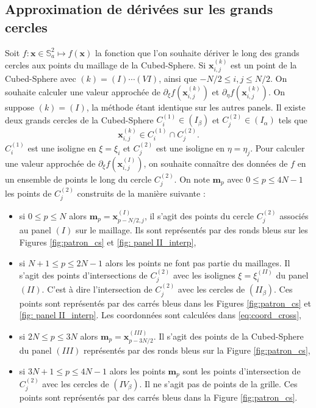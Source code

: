 \subsection{Approximation de dérivées sur les grands cercles}

Soit $f : \mathbf{x}\in \mathbb{S}_a^2 \mapsto f(\mathbf{x})$ la fonction que l'on souhaite dériver le long des grands cercles aux points du maillage de la Cubed-Sphere.
Si $\mathbf{x}_{i,j}^{(k)}$ est un point de la Cubed-Sphere avec $(k) = (I) \cdots (VI)$, ainsi que $-N/2 \leq i,j \leq N/2$. On souhaite calculer une valeur approchée de 
$
\partial_{\xi} f (\mathbf{x}_{i,j}^{(k)})$ et $\partial_{\eta} f (\mathbf{x}_{i,j}^{(k)})$.
On suppose $(k) = (I)$, la méthode étant identique sur les autres panels. Il existe deux grands cercles de la Cubed-Sphere $C_i^{(1)} \in (I_{\beta})$ et $C_j^{(2)} \in (I_{\alpha})$ tels que 
\begin{equation}
\mathbf{x}_{i,j}^{(k)} \in C_i^{(1)} \cap C^{(2)}_j.
\end{equation}
$C^{(1)}_i$ est une isoligne en $\xi = \xi_i$ et $C^{(2)}_j$ est une isoligne en $\eta = \eta_j$.
Pour calculer une valeur approchée de $\partial_{\xi} f (\mathbf{x}_{i,j}^{(I)})$, on souhaite connaître des données de $f$ en un ensemble de points le long du cercle $C^{(2)}_j$. On note $\mathbf{m}_p$ avec $0 \leq p \leq 4N-1$ les points de $C^{(2)}_j$ construits de la manière suivante :
\begin{itemize}
\item si $0 \leq p \leq N$ alors $\mathbf{m}_p = \mathbf{x}^{(I)}_{p-N/2,j}$, il s'agit des points du cercle $C^{(2)}_j$ associés au panel $(I)$ sur le maillage. Ils sont représentés par des ronds bleus sur les Figures \ref{fig:patron_cs} et \ref{fig: panel II_interp},
\item si $N+1 \leq p \leq 2N-1$ alors les points ne font pas partie du maillages. Il s'agit des points d'intersections de $C^{(2)}_j$ avec les isolignes $\xi = \xi_i^{(II)}$ du panel $(II)$. C'est à dire l'intersection de $C^{(2)}_j$ avec les cercles de $(II_{\beta})$. Ces points sont représentés par des carrés bleus dans les Figures \ref{fig:patron_cs} et \ref{fig: panel II_interp}. Les coordonnées sont calculées dans \eqref{eq:coord_cross},
\item si $2N \leq p \leq 3N$ alors $\mathbf{m}_p = \mathbf{x}^{(III)}_{p-3N/2}$. Il s'agit des points de la Cubed-Sphere du panel $(III)$ représentés par des ronds bleus sur la Figure \ref{fig:patron_cs},
\item si $3N+1 \leq p \leq 4N-1$ alors les points $\mathbf{m}_p$ sont les points d'intersection de $C^{(2)}_j$ avec les cercles de $(IV_{\beta})$. Il ne s'agit pas de points de la grille. Ces points sont représentés par des carrés bleus dans la Figure \ref{fig:patron_cs}.
\end{itemize}

